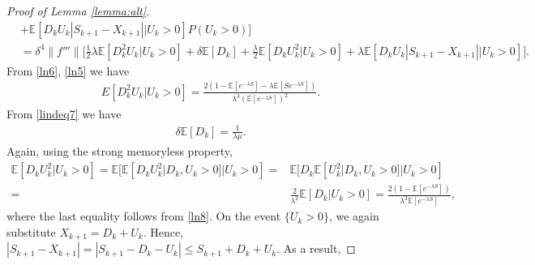 \documentclass[11pt,letterpaper,reqno]{article}
\theoremstyle{thmstyleone}%
\theoremstyle{thmstyletwo}%
\theoremstyle{thmstylethree}%
\numberwithin{equation}{section}
\begin{document}
\begin{proof}[Proof of Lemma \ref{lemma:alt}]
\begin{align}
       &+\mathbb E[D_kU_k|S_{k+1}-X_{k+1}||U_k>0]P(U_k>0)\bigg] \nonumber\\
       & = \delta^4 \|f'''\|\bigg[\frac{1}{2}\lambda \mathbb E[D_k^2U_k|U_k>0]+\delta\mathbb E[D_k]+ \frac{\lambda}{2}\mathbb E[D_kU_k^2|U_k>0] +\lambda\mathbb E[D_kU_k|S_{k+1}-X_{k+1}||U_k>0] \bigg].      
\end{align}
From \eqref{ln6}, \eqref{ln5} we have
\begin{align}\label{ln7}
    E[D_k^2U_k|U_k>0]=\frac{2\left(1 - \mathbb E[e^{-\lambda S}] - \lambda \mathbb E[S e^{-\lambda S}]\right)}{\lambda^3 (\mathbb E[e^{-\lambda S}])^2}.
\end{align}
From \eqref{lindeq7} we have 
\begin{align}\label{lnB2}
    \delta\mathbb E[D_k]=\frac{1}{\lambda \mu}.
\end{align}
Again, using the strong memoryless property,
\begin{align}\label{ln9}
     \mathbb E[D_kU_k^2|U_k>0]=\mathbb E[\mathbb E[D_kU_k^2|D_k,U_k>0]|U_k>0]=&\mathbb E[D_k\mathbb E[U_k^2|D_k,U_k>0]|U_k>0] \nonumber\\
     =&\frac{2}{\lambda^2}\mathbb E[D_k|U_k>0]=\frac{2(1-\mathbb E[e^{-\lambda S}])}{\lambda^3 \mathbb E[e^{-\lambda S}]},
\end{align}
where the last equality follows from \eqref{ln8}. On the event $\{U_k > 0\}$, we again substitute $X_{k+1} = D_k + U_k$. Hence, $|S_{k+1} - X_{k+1}| = |S_{k+1} - D_k - U_k| \leq S_{k+1} + D_k + U_k$. As a result,


\end{proof}
\end{document}
